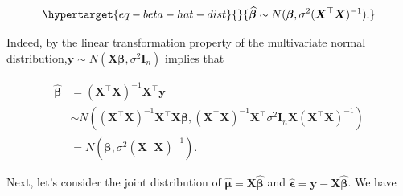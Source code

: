 \documentclass[
  11pt,
  letterpaper,
  oneside]{book}
\theoremstyle{plain}
\theoremstyle{plain}
\theoremstyle{definition}
\theoremstyle{definition}
\theoremstyle{plain}
\theoremstyle{remark}
\begin{document}
\begin{equation}\protect\hypertarget{eq-beta-hat-dist}{}{
\boldsymbol{\widehat{\beta}} \sim N(\boldsymbol{\beta}, \sigma^2 (\boldsymbol{X}^\top \boldsymbol{X})^{-1}).
}\label{eq-beta-hat-dist}\end{equation}

Indeed, by the linear transformation property of the multivariate normal
distribution,\(\boldsymbol{y} \sim N(\boldsymbol{X} \boldsymbol{\beta}, \sigma^2 \boldsymbol{I}_n)\)
implies that

\[
\begin{split}
\boldsymbol{\widehat{\beta}} &= (\boldsymbol{X}^\top \boldsymbol{X})^{-1}\boldsymbol{X}^\top \boldsymbol{y} \\
&\sim N((\boldsymbol{X}^\top \boldsymbol{X})^{-1}\boldsymbol{X}^\top \boldsymbol{X} \boldsymbol{\beta}, (\boldsymbol{X}^\top \boldsymbol{X})^{-1}\boldsymbol{X}^\top \sigma^2 \boldsymbol{I}_n \boldsymbol{X}(\boldsymbol{X}^\top \boldsymbol{X})^{-1}) \\
&= N(\boldsymbol{\beta}, \sigma^2 (\boldsymbol{X}^\top \boldsymbol{X})^{-1}).
\end{split}
\]

Next, let's consider the joint distribution of
\(\boldsymbol{\widehat{\mu}} = \boldsymbol{X} \boldsymbol{\widehat{\beta}}\)
and
\(\boldsymbol{\widehat{\epsilon}} = \boldsymbol{y} - \boldsymbol{X} \boldsymbol{\widehat{\beta}}\).
We have
\end{document}
